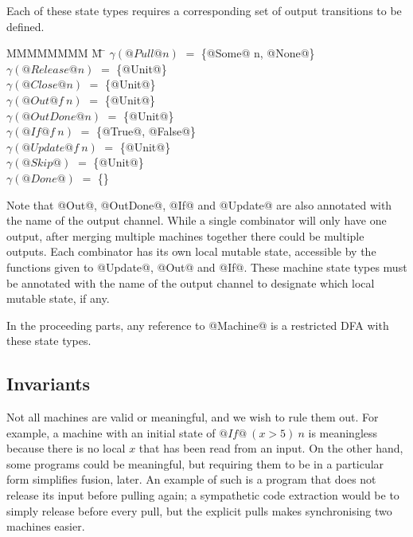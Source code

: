 Each of these state types requires a corresponding set of output transitions to be defined.
\begin{tabbing}
MMMMMMMM \= M \= \kill
$\gamma(@Pull @n)$
                            \> $=$ \> \{@Some@ n, @None@\} \\
$\gamma(@Release @n)$
                            \> $=$ \> \{@Unit@\} \\
$\gamma(@Close @n)$
                            \> $=$ \> \{@Unit@\} \\
$\gamma(@Out @   f~n)$
                            \> $=$ \> \{@Unit@\} \\
$\gamma(@OutDone @ n)$
                            \> $=$ \> \{@Unit@\} \\
$\gamma(@If @    f~n)$
                            \> $=$ \> \{@True@, @False@\} \\
$\gamma(@Update @f~n)$
                            \> $=$ \> \{@Unit@\} \\
$\gamma(@Skip@      )$
                            \> $=$ \> \{@Unit@\} \\
$\gamma(@Done@      )$
                            \> $=$ \> \{\} \\
\end{tabbing}

Note that @Out@, @OutDone@, @If@ and @Update@ are also annotated with the name of the output channel.
While a single combinator will only have one output, after merging multiple machines together there could be multiple outputs.
Each combinator has its own local mutable state, accessible by the functions given to @Update@, @Out@ and @If@.
These machine state types must be annotated with the name of the output channel to designate which local mutable state, if any.

In the proceeding parts, any reference to @Machine@ is a restricted DFA with these state types.

\subsection{Invariants}
Not all machines are valid or meaningful, and we wish to rule them out.
For example, a machine with an initial state of $@If@~(x>5)~n$ is meaningless because there is no local $x$ that has been read from an input. 
On the other hand, some programs could be meaningful, but requiring them to be in a particular form simplifies fusion, later.
An example of such is a program that does not release its input before pulling again; a sympathetic code extraction would be to simply release before every pull, but the explicit pulls makes synchronising two machines easier.

